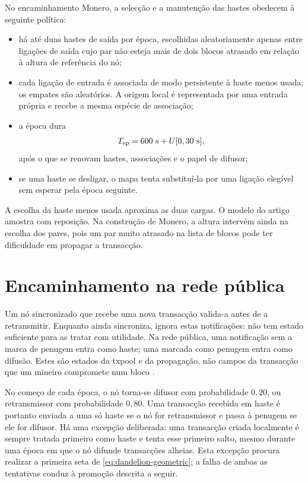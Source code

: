 %
No encaminhamento Monero, a selecção e a manutenção das hastes obedecem à
seguinte política:
\begin{itemize}
 \item há até duas hastes de saída por época, escolhidas aleatoriamente apenas
 entre ligações de saída cujo par não esteja mais de dois blocos atrasado em
 relação à altura de referência do nó;
 \item cada ligação de entrada é associada de modo persistente à haste menos
 usada; os empates são aleatórios. A origem local é representada por uma
 entrada própria e recebe a mesma espécie de associação;
 \item a época dura
 \begin{align}
  T_{\rm ep}=600\ {\rm s}+U[0,30\ {\rm s}],
  \label{eq:dandelion-monero-epoch}
 \end{align}
 após o que se renovam hastes, associações e o papel de difusor;
 \item se uma haste se desligar, o mapa tenta substituí-la por uma ligação
 elegível sem esperar pela época seguinte.
\end{itemize}


A escolha da haste menos usada aproxima as duas cargas. O modelo do artigo
amostra com reposição. Na construção de Monero, a altura intervém ainda na
escolha dos pares, pois um par muito atrasado na lista de blocos pode ter
dificuldade em propagar a transacção.


\section{Encaminhamento na rede pública}
\label{sec:dandelion-monero-public}

Um nó sincronizado que recebe uma nova transacção valida-a antes de a
retransmitir. Enquanto ainda sincroniza, ignora estas notificações: não tem
estado suficiente para as tratar com utilidade. Na rede pública, uma
notificação sem a marca de penugem entra como haste; uma marcada como penugem
entra como difusão. Estes são estados da txpool e da propagação, não campos da
transacção que um mineiro compromete num bloco \cite{monero-source-v16}.

No começo de cada época, o nó torna-se difusor com probabilidade \(0{,}20\),
ou retransmissor com probabilidade \(0{,}80\). Uma transacção recebida em haste
é portanto enviada a uma só haste se o nó for retransmissor e passa à penugem
se ele for difusor. Há uma excepção deliberada: uma transacção criada
localmente é sempre tratada primeiro como haste e tenta esse primeiro salto,
mesmo durante uma época em que o nó difunde transacções alheias. Esta excepção
procura realizar a primeira seta de \eqref{eq:dandelion-geometric}; a falha de
ambas as tentativas conduz à promoção descrita a seguir.


